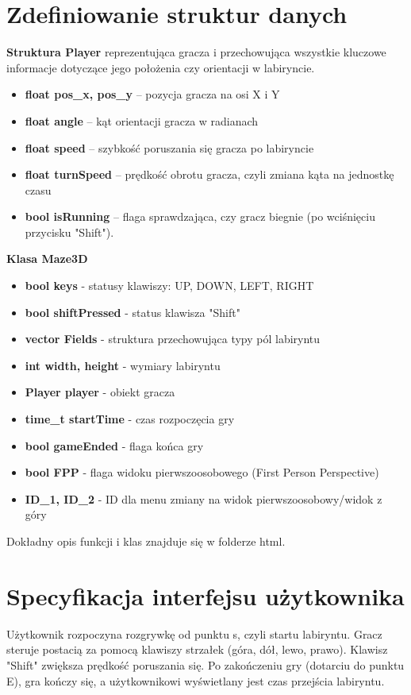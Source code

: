 \documentclass{article}
\begin{document}
\section{Zdefiniowanie struktur danych}
\textbf{Struktura Player} reprezentująca gracza i przechowująca wszystkie kluczowe informacje dotyczące jego położenia czy orientacji w labiryncie.
\begin{itemize}
    \item \textbf{float pos\_x, pos\_y} – pozycja gracza na osi X i Y 
    \item \textbf{float angle} – kąt orientacji gracza w radianach
    \item \textbf{float speed} – szybkość poruszania się gracza po labiryncie
    \item \textbf{float turnSpeed} – prędkość obrotu gracza, czyli zmiana kąta na jednostkę czasu
    \item \textbf{bool isRunning} – flaga sprawdzająca, czy gracz biegnie (po wciśnięciu przycisku "Shift").
\end{itemize}

\noindent
\textbf{Klasa Maze3D} 
\begin{itemize}
    \item \textbf{bool keys} - statusy klawiszy: UP, DOWN, LEFT, RIGHT
    \item \textbf{bool shiftPressed}                  - status klawisza "Shift"
    \item \textbf{vector Fields} - struktura przechowująca typy pól labiryntu
    \item \textbf{int width, height} - wymiary labiryntu
    \item \textbf{Player player} - obiekt gracza
    \item \textbf{time\_t startTime} - czas rozpoczęcia gry
    \item \textbf{bool gameEnded} - flaga końca gry
    \item \textbf{bool FPP} - flaga widoku pierwszoosobowego (First Person Perspective)
    \item \textbf{ID\_1, ID\_2} - ID dla menu zmiany na widok pierwszoosobowy/widok z góry
\end{itemize}
\noindent

Dokładny opis funkcji i klas znajduje się w folderze html. 

\section{Specyfikacja interfejsu użytkownika}
Użytkownik rozpoczyna rozgrywkę od punktu s, czyli startu labiryntu. Gracz steruje postacią za pomocą klawiszy strzałek (góra, dół, lewo, prawo). Klawisz "Shift" zwiększa prędkość poruszania się. Po zakończeniu gry (dotarciu do punktu E), gra kończy się, a użytkownikowi wyświetlany jest czas przejścia labiryntu.
\end{document}
